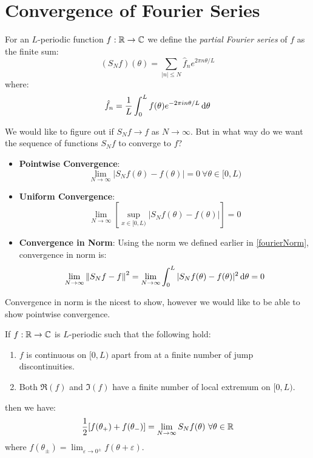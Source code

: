 \documentclass[../main.tex]{subfiles}
\begin{document}
\section{Convergence of Fourier Series}
\begin{definition}
  For an $L$-periodic function $f: \mathbb{R} \to \mathbb{C}$ we define the \textit{partial Fourier series} of $f$ as the finite sum:
  \[
    (S_N f)(\theta) = \sum_{|n| \leq N} \hat{f}_{n} e^{2 \pi n \theta / L}
  \]
  where:
  \[
    \hat{f}_{n} = \frac{1}{L} \int_{0}^{L} f(\theta) e^{- 2\pi i n \theta/L} \d{\theta}
  \]
\end{definition}
We would like to figure out if $S_N f \to f$ as $N \to \infty$.
But in what way do we want the sequence of functions $S_N f$ to converge to $f$?
\begin{itemize}
  \item \textbf{Pointwise Convergence}:
    \[
      \lim_{N \to \infty} |S_{N}f(\theta) - f(\theta)| = 0\ \forall \theta \in [0, L)
    \]
  \item \textbf{Uniform Convergence}:
    \[
      \lim_{N \to \infty} \left[\sup_{x \in [0, L)} |S_N f(\theta) - f(\theta)|\right] = 0
    \]
  \item \textbf{Convergence in Norm}:
    Using the norm we defined earlier in \cref{fourierNorm}, convergence in norm is:
    \[
      \lim_{N \to \infty} \norm{S_N f - f}^2 = \lim_{N \to \infty} \int_{0}^{L} |S_{N} f(\theta) - f(\theta)|^2 \d{\theta} = 0
    \]
\end{itemize}
Convergence in norm is the nicest to show, however we would like to be able to show pointwise convergence.
\begin{theorem}
  If $f: \mathbb{R} \to \mathbb{C}$ is $L$-periodic such that the following hold: \label{convFourier}
  \begin{enumerate}
    \item $f$ is continuous on $[0, L)$ apart from at a finite number of jump discontinuities.
    \item Both $\Re(f)$ and $\Im(f)$ have a finite number of local extremum on $[0, L)$.
  \end{enumerate}
  then we have:
  \[
    \frac{1}{2}[f(\theta_{+}) + f(\theta_{-})] = \lim_{N \to \infty} S_N f(\theta)\ \forall \theta \in \mathbb{R}
  \]
  where $f(\theta_{\pm}) = \lim_{\varepsilon \to 0^\pm} f(\theta + \varepsilon)$.
\end{theorem}
\end{document}
